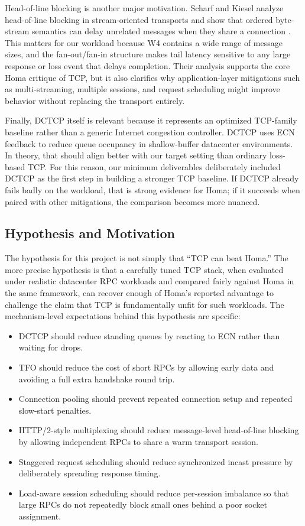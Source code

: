 \documentclass[11pt]{article}
\begin{document}
Head-of-line blocking is another major motivation. Scharf and Kiesel analyze head-of-line blocking in stream-oriented transports and show that ordered byte-stream semantics can delay unrelated messages when they share a connection \cite{hol}. This matters for our workload because W4 contains a wide range of message sizes, and the fan-out/fan-in structure makes tail latency sensitive to any large response or loss event that delays completion. Their analysis supports the core Homa critique of TCP, but it also clarifies why application-layer mitigations such as multi-streaming, multiple sessions, and request scheduling might improve behavior without replacing the transport entirely.

Finally, DCTCP itself is relevant because it represents an optimized TCP-family baseline rather than a generic Internet congestion controller. DCTCP uses ECN feedback to reduce queue occupancy in shallow-buffer datacenter environments. In theory, that should align better with our target setting than ordinary loss-based TCP. For this reason, our minimum deliverables deliberately included DCTCP as the first step in building a stronger TCP baseline. If DCTCP already fails badly on the workload, that is strong evidence for Homa; if it succeeds when paired with other mitigations, the comparison becomes more nuanced.

\subsection{Hypothesis and Motivation}

The hypothesis for this project is not simply that ``TCP can beat Homa.'' The more precise hypothesis is that a carefully tuned TCP stack, when evaluated under realistic datacenter RPC workloads and compared fairly against Homa in the same framework, can recover enough of Homa's reported advantage to challenge the claim that TCP is fundamentally unfit for such workloads. The mechanism-level expectations behind this hypothesis are specific:

\begin{itemize}[leftmargin=1.5em]
  \item DCTCP should reduce standing queues by reacting to ECN rather than waiting for drops.
  \item TFO should reduce the cost of short RPCs by allowing early data and avoiding a full extra handshake round trip.
  \item Connection pooling should prevent repeated connection setup and repeated slow-start penalties.
  \item HTTP/2-style multiplexing should reduce message-level head-of-line blocking by allowing independent RPCs to share a warm transport session.
  \item Staggered request scheduling should reduce synchronized incast pressure by deliberately spreading response timing.
  \item Load-aware session scheduling should reduce per-session imbalance so that large RPCs do not repeatedly block small ones behind a poor socket assignment.
\end{itemize}
\end{document}
